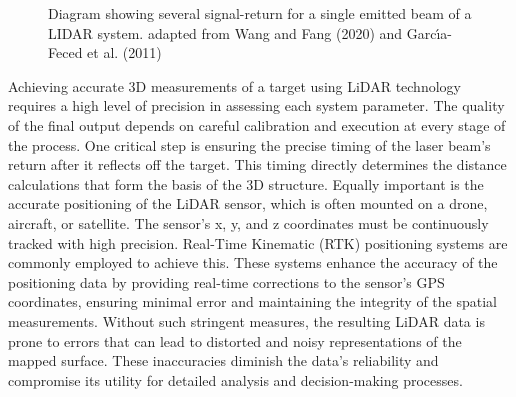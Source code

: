 \documentclass[
  letterpaper,
  11pt,
  english,
  singlespacing,
  headsepline]{MastersDoctoralThesis}
\begin{document}
\begin{spacing}{1.5}
\begin{figure}


\caption{\label{fig-LIDAR}Diagram showing several signal-return for a
single emitted beam of a LIDAR system. adapted from Wang and Fang (2020)
and Garcı́a-Feced et al. (2011)}

\end{figure}%

Achieving accurate 3D measurements of a target using LiDAR technology
requires a high level of precision in assessing each system parameter.
The quality of the final output depends on careful calibration and
execution at every stage of the process. One critical step is ensuring
the precise timing of the laser beam's return after it reflects off the
target. This timing directly determines the distance calculations that
form the basis of the 3D structure. Equally important is the accurate
positioning of the LiDAR sensor, which is often mounted on a drone,
aircraft, or satellite. The sensor's x, y, and z coordinates must be
continuously tracked with high precision. Real-Time Kinematic (RTK)
positioning systems are commonly employed to achieve this. These systems
enhance the accuracy of the positioning data by providing real-time
corrections to the sensor's GPS coordinates, ensuring minimal error and
maintaining the integrity of the spatial measurements. Without such
stringent measures, the resulting LiDAR data is prone to errors that can
lead to distorted and noisy representations of the mapped surface. These
inaccuracies diminish the data's reliability and compromise its utility
for detailed analysis and decision-making processes.


\end{spacing}
\end{document}

